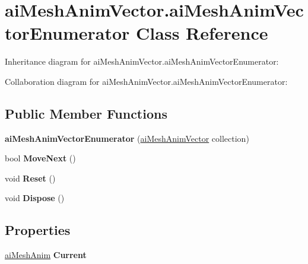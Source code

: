 \hypertarget{classai_mesh_anim_vector_1_1ai_mesh_anim_vector_enumerator}{\section{ai\+Mesh\+Anim\+Vector.\+ai\+Mesh\+Anim\+Vector\+Enumerator Class Reference}
\label{classai_mesh_anim_vector_1_1ai_mesh_anim_vector_enumerator}
}


Inheritance diagram for ai\+Mesh\+Anim\+Vector.\+ai\+Mesh\+Anim\+Vector\+Enumerator\+:


Collaboration diagram for ai\+Mesh\+Anim\+Vector.\+ai\+Mesh\+Anim\+Vector\+Enumerator\+:
\subsection*{Public Member Functions}
\begin{DoxyCompactItemize}
\item 
\hypertarget{classai_mesh_anim_vector_1_1ai_mesh_anim_vector_enumerator_a737c997909acf2e7b462436292bf98a1}{{\bfseries ai\+Mesh\+Anim\+Vector\+Enumerator} (\hyperlink{classai_mesh_anim_vector}{ai\+Mesh\+Anim\+Vector} collection)}\label{classai_mesh_anim_vector_1_1ai_mesh_anim_vector_enumerator_a737c997909acf2e7b462436292bf98a1}

\item 
\hypertarget{classai_mesh_anim_vector_1_1ai_mesh_anim_vector_enumerator_af2430c47c515701964e33fb9ef5e467b}{bool {\bfseries Move\+Next} ()}\label{classai_mesh_anim_vector_1_1ai_mesh_anim_vector_enumerator_af2430c47c515701964e33fb9ef5e467b}

\item 
\hypertarget{classai_mesh_anim_vector_1_1ai_mesh_anim_vector_enumerator_aecef72a33813576a366610ed6592cb1e}{void {\bfseries Reset} ()}\label{classai_mesh_anim_vector_1_1ai_mesh_anim_vector_enumerator_aecef72a33813576a366610ed6592cb1e}

\item 
\hypertarget{classai_mesh_anim_vector_1_1ai_mesh_anim_vector_enumerator_ac6a77e3519abfdcd484a104f24278e01}{void {\bfseries Dispose} ()}\label{classai_mesh_anim_vector_1_1ai_mesh_anim_vector_enumerator_ac6a77e3519abfdcd484a104f24278e01}

\end{DoxyCompactItemize}
\subsection*{Properties}
\begin{DoxyCompactItemize}
\item 
\hypertarget{classai_mesh_anim_vector_1_1ai_mesh_anim_vector_enumerator_a4c6a39faa7c431f32ef6d5ca50865889}{\hyperlink{structai_mesh_anim}{ai\+Mesh\+Anim} {\bfseries Current}}\label{classai_mesh_anim_vector_1_1ai_mesh_anim_vector_enumerator_a4c6a39faa7c431f32ef6d5ca50865889}

\end{DoxyCompactItemize}


